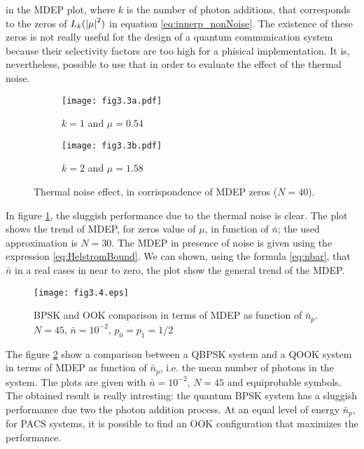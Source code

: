     in the MDEP plot, where $k$ is the number of photon additions, that corresponds to the zeros
    of $L_k(\absolutevalue{\mu}^2)$ in equation \ref{eq:innerp_nonNoise}.
    The existence of these zeros is not really useful for the design of a quantum communication
    system because their selectivity factors are too high for a phisical implementation. It is, 
    nevertheless, possible to use that in order to evaluate the effect of the thermal noise.
    \begin{figure}[t]
        \begin{subfigure}{0.5\textwidth}
            \texttt{[image: fig3.3a.pdf]}
            \caption{$k=1$ and $\mu = 0.54$}
        \end{subfigure}
        \begin{subfigure}{0.5\textwidth}
            \texttt{[image: fig3.3b.pdf]}
            \caption{$k=2$ and $\mu = 1.58$}
        \end{subfigure}
        \caption{Thermal noise effect, in corrispondence of MDEP zeros ($N=40$).}
        \label{fig:3.3}
    \end{figure}
    In figure \ref{fig:3.3}, the sluggish performance due to the thermal noise is clear. The plot
    shows the trend of MDEP, for zeros value of $\mu$, in function of $\bar{n}$; the used approximation
    is $N=30$. The MDEP in presence of noise is given using the expression \ref{eq:HelstromBound}.
    We can shown, using the formula \ref{eq:nbar}, that $\bar{n}$ in a real cases in near to zero, the 
    plot show the general trend of the MDEP.

    \begin{figure}[t]
        \texttt{[image: fig3.4.eps]}
        \caption{BPSK and OOK comparison in terms of MDEP as function of $\bar{n}_p$. \\$N=45$, $\bar{n}=10^{-2}$, $p_0=p_1=1/2$}
        \label{fig:3.4}
    \end{figure}
    
    The figure \ref{fig:3.4} show a comparison between a QBPSK system and a QOOK system in terms of 
    MDEP as function of $\bar{n}_p$, i.e. the mean number of photons in the system. 
    The plots are given with $\bar{n}= 10^{-2}$, $N=45$ and equiprobable symbols.
    The obtained result is really intresting: the quantum BPSK system has a sluggish performance due two 
    the photon addition process. At an equal level of energy $\bar{n}_p$, for PACS systems, it is
    possible to find an OOK configuration that maximizes the performance.
    